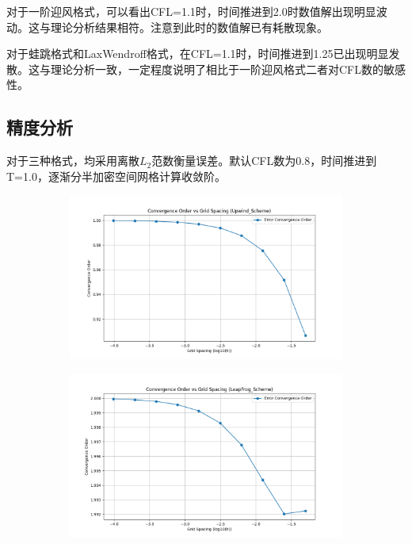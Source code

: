 \documentclass[12pt, a4paper]{article}
\begin{document}
对于一阶迎风格式，可以看出CFL=1.1时，时间推进到2.0时数值解出现明显波动。这与理论分析结果相符。注意到此时的数值解已有耗散现象。

对于蛙跳格式和LaxWendroff格式，在CFL=1.1时，时间推进到1.25已出现明显发散。这与理论分析一致，一定程度说明了相比于一阶迎风格式二者对CFL数的敏感性。

\subsection{精度分析}
对于三种格式，均采用离散$L_2$范数衡量误差。默认CFL数为0.8，时间推进到T=1.0，逐渐分半加密空间网格计算收敛阶。
\begin{figure}[htbp]
    \centering
    \begin{subfigure}[b]{0.45\textwidth} 
        \centering
        \includegraphics[width=\textwidth]{./pictures/Convergence_Order_of_Upwind_Scheme.png} 
    \end{subfigure}
    \hfill
    \begin{subfigure}[b]{0.45\textwidth} 
        \centering
        \includegraphics[width=\textwidth]{./pictures/Convergence_Order_of_LeapFrog_Scheme.png} 

\end{subfigure}
\end{figure}
\end{document}
